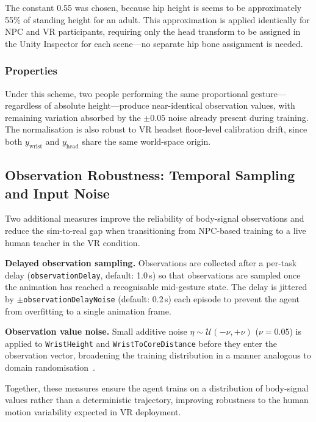 \documentclass[../report.tex]{subfiles}
\begin{document}
    The constant 0.55 was chosen, because hip height is seems to be approximately 55\% of standing height for an adult. This approximation is applied identically for NPC and VR participants, requiring only the head transform to be assigned in the Unity Inspector for each scene—no separate hip bone assignment is needed.

    \subsubsection{Properties}

    Under this scheme, two people performing the same proportional gesture---regardless of absolute height---produce near-identical observation values, with remaining variation absorbed by the $\pm 0.05$ noise already present during training. The normalisation is also robust to VR headset floor-level calibration drift, since both $y_{\text{wrist}}$ and $y_{\text{head}}$ share the same world-space origin.

    \subsection{Observation Robustness: Temporal Sampling and Input Noise}
    \label{sec:methodology:observation_robustness}

    Two additional measures improve the reliability of body-signal observations and reduce the sim-to-real gap when transitioning from NPC-based training to a live human teacher in the VR condition.

    \textbf{Delayed observation sampling.} Observations are collected after a per-task delay (\texttt{observationDelay}, default: 1.0\,s) so that observations are sampled once the animation has reached a recognisable mid-gesture state. The delay is jittered by $\pm$\texttt{observationDelayNoise} (default: 0.2\,s) each episode to prevent the agent from overfitting to a single animation frame.

    \textbf{Observation value noise.} Small additive noise $\eta \sim \mathcal{U}(-\nu, +\nu)$ ($\nu = 0.05$) is applied to \texttt{WristHeight} and \texttt{WristToCoreDistance} before they enter the observation vector, broadening the training distribution in a manner analogous to domain randomisation~\citep{8202133}.

    Together, these measures ensure the agent trains on a distribution of body-signal values rather than a deterministic trajectory, improving robustness to the human motion variability expected in VR deployment.
\end{document}
